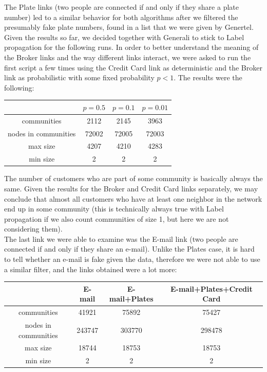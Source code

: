 \documentclass[a4paper,11pt]{book}
\begin{document}
The Plate links (two people are connected if and only if they share a plate number) led to a similar behavior for both algorithms after we filtered the presumably fake plate numbers, found in a list that we were given by Genertel.\\

Given the results so far, we decided together with Generali to stick to Label propagation for the following runs. In order to better understand the meaning of the Broker links and the way different links interact, we were asked to run the first script a few times using the Credit Card link as deterministic and the Broker link as probabilistic with some fixed probability $p < 1$. The results were the following:
 \begin{center}
  \begin{tabular}{||c|c|c|c||}
\hline
 \phantom{0} & $p = 0.5$ & $p = 0.1$ & $p = 0.01$\\ 
\hline
communities & 2112 & 2145 & 3963 \\
\hline
nodes in communities & 72002 & 72005 & 72003\\
\hline
max size & 4207 & 4210 & 4283\\
\hline
min size & 2 & 2 & 2\\
\hline
\end{tabular}
\end{center}
The number of customers who are part of some community is basically always the same. Given the results for the Broker and Credit Card links separately, we may conclude that almost all customers who have at least one neighbor in the network end up in some community (this is technically always true with Label propagation if we also count communities of size 1, but here we are not considering them).\\

The last link we were able to examine was the E-mail link (two people are connected if and only if they share an e-mail). Unlike the Plates case, it is hard to tell whether an e-mail is fake given the data, therefore we were not able to use a similar filter, and the links obtained were a lot more:
\begin{center}
  \begin{tabular}{||c|c|c|c||}
\hline
 \phantom{0} & E-mail & E-mail+Plates & E-mail+Plates+Credit Card\\ 
\hline
communities & 41921 & 75892 & 75427 \\
\hline
nodes in communities & 243747 & 303770 & 298478\\
\hline
max size & 18744 & 18753 & 18753\\
\hline
min size & 2 & 2 & 2\\
\hline
\end{tabular}
\end{center}
\end{document}
